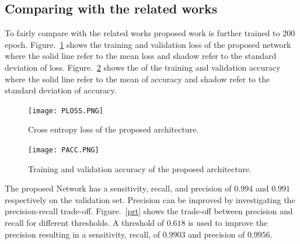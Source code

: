 \subsection{Comparing with the related works}
To fairly compare with the related works proposed work is further trained to 200 epoch. Figure.~\ref{ploss} shows the training and validation loss of the proposed network where the solid line refer to the mean loss and shadow refer to the standard deviation of loss. Figure.~\ref{pacc} shows the of the training and validation accuracy where the solid line refer to the mean of accuracy and shadow refer to the standard deviation of accuracy. 
\begin{center}
\begin{figure}[htbp]
\centerline{\texttt{[image: PLOSS.PNG]}}
\caption{Cross entropy loss of the proposed architecture.}
\label{ploss}
\end{figure}
\end{center}
\begin{center}
\begin{figure}[htbp]
\centerline{\texttt{[image: PACC.PNG]}}
\caption{Training and validation accuracy of the proposed architecture.}
\label{pacc}
\end{figure}
\end{center}
The proposed Network has a sensitivity, recall, and precision of $0.994$ and $0.991$ respectively on the validation set. Precision can be improved by investigating the precision-recall trade-off. Figure.~\ref{prt} shows the trade-off between precision and recall for different thresholds. A threshold of $0.618$ is used to improve the precision resulting in a sensitivity, recall, of $0.9903$ and precision of $0.9956$.


